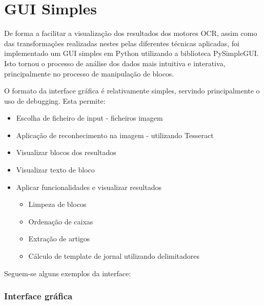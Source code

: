 \section{GUI Simples}
\label{gui_simples}

De forma a facilitar a visualização dos resultados dos motores OCR, assim como das transformações realizadas nestes pelas diferentes técnicas aplicadas, foi implementado um GUI simples em Python utilizando a biblioteca PySimpleGUI. Isto tornou o processo de análise dos dados mais intuitiva e interativa, principalmente no processo de manipulação de blocos.

O formato da interface gráfica é relativamente simples, servindo principalmente o uso de debugging. Esta permite:

\begin{itemize}\setlength\itemsep{0.05cm}
    \item Escolha de ficheiro de input - ficheiros imagem
    \item Aplicação de reconhecimento na imagem - utilizando Tesseract
    \item Visualizar blocos dos resultados
    \item Visualizar texto de bloco
    \item Aplicar funcionalidades e visualizar resultados
    \begin{itemize}
        \item Limpeza de blocos
        \item Ordenação de caixas
        \item Extração de artigos
        \item Cálculo de template de jornal utilizando delimitadores
    \end{itemize}
\end{itemize}

Seguem-se alguns exemplos da interface:

\subsubsection{Interface gráfica}

